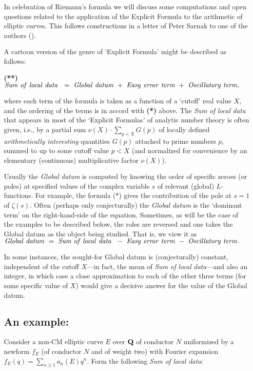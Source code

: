 \documentclass[11pt]{article}
\theoremstyle{plain}
\theoremstyle{definition}
\numberwithin{equation}{section}
\numberwithin{figure}{section}
\numberwithin{table}{section}
\def\Q{\bf{Q}}
\begin{document}
In celebration of Riemann's formula  we will discuss some computations and open questions related to the application of the Explicit Formula to the arithmetic of elliptic curves. This follows constructions in a letter of Peter Sarnak to one of the authors (\cite{S}).

A cartoon version of the genre of `Explicit Formula' might be described as follows:

 {{\bf (**)} \ \  ${\rm{\it Sum\ of\ local\ data\  }}  \ = \  {\rm{\it Global\ datum}}\ +\  {\rm{\it  Easy\  error\ term}}\ +\  {\rm{\it  Oscillatory\ term}},$ }


 \noindent where each  term of the formula  is taken as a function of a `cutoff' real value $X$, and the ordering of the terms is in accord with {\bf(*)} above.
  The {\it Sum of local data} that appears in most of the `Explicit Formulas' of analytic number theory is often given, i.e., by a partial sum $\nu(X)\cdot\sum_{p<X}G(p)$ of locally defined {\it arithmetically interesting} quantities $G(p)$ attached to prime numbers $p$, summed to up to some cutoff
value $p<X$  (and normalized for convenience by an elementary (continuous) multiplicative factor $\nu(X)$).

   Usually the {\it Global datum} is computed by knowing the order of specific zeroes (or poles) at specified values of the complex variable $s$  of relevant (global) $L$-functions.  For example, the formula {(*)} gives the contribution of the pole at $s=1$ of $\zeta(s)$.  Often (perhaps only conjecturally)  the  {\it Global datum} is the `dominant term'    on the right-hand-side of the equation.  Sometimes, as will be the case  of the examples to be described below, the roles are reversed and one takes the Global datum as the object being studied.  That is, we view it as ${\rm{\it Global\ datum}}\ = \  {\rm{\it Sum\ of\ local\ data\  }}\ -\  {\rm{\it  Easy\ error\ term}}\ -\  {\rm{\it  Oscillatory\ term}}.$

   In some instances,  the sought-for Global datum is  (conjecturally) constant, independent of the cutoff $X$---in fact, the mean of {\it Sum of local data}---and also an integer, in which case a close approximation to each of the other three terms (for some specific value of $X$) would give a decisive answer for the value of the Global datum.


 \subsection{\bf An example: }  Consider a non-CM elliptic curve $E$ over ${\Q}$ of conductor $N$  uniformized by a newform $f_E$ (of conductor $N$ and of weight two) with Fourier expansion  $f_E(q) = \sum_{n\ge 1}a_n(E)q^n$. Form the following {\it Sum of local data}:
\end{document}
